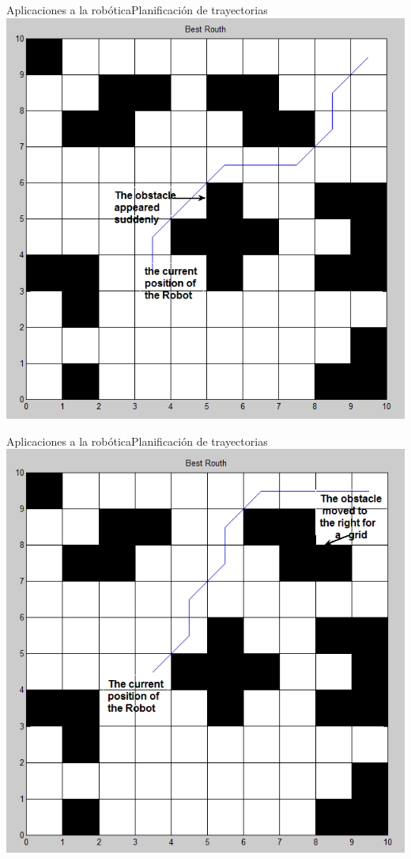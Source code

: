 \documentclass{beamer}
\begin{document}
\begin{frame}{Aplicaciones a la robótica}{Planificación de trayectorias}
	\centering
	\includegraphics[scale=0.3]{path3}
\end{frame}
\begin{frame}{Aplicaciones a la robótica}{Planificación de trayectorias}
	\centering
	\includegraphics[scale=0.3]{path4}
\end{frame}
\end{document}
